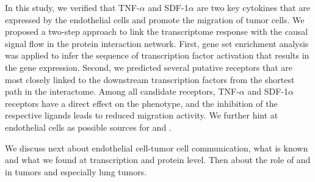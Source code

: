 In this study, we verified that TNF-$\alpha$ and SDF-1$\alpha$ are two
key cytokines that are expressed by the endothelial cells and promote the migration
of tumor cells. We proposed a two-step approach to link the transcriptome response
with the causal signal flow in the protein interaction network. First, gene set
enrichment analysis was applied to infer the sequence of transcription factor
activation that results in the gene expression. Second, we predicted several
putative receptors that are most closely linked to the downstream transcription
factors from the 
shortest path in the interactome. Among all candidate receptors,
TNF-$\alpha$ and SDF-1$\alpha$ receptors have a direct effect on the phenotype,
and the inhibition of the respective ligands leads to reduced migration 
activity. We further
hint at endothelial cells as possible sources for \tnfa and \sdfonea.

We discuss next about endothelial cell-tumor cell communication, what is known and what we found at transcription and protein level.
Then about the role of \tnfa and \sdfonea in tumors and especially lung tumors.

